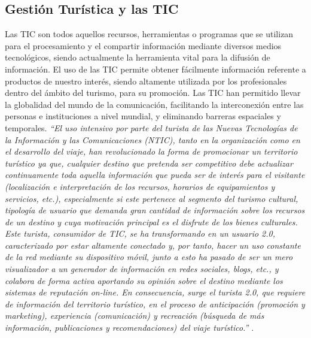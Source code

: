 \documentclass[12pt,letterpaper,openany]{book}
\begin{document}
\subsection{Gestión Turística y las TIC}
Las TIC son todos aquellos recursos, herramientas o programas que se utilizan para el procesamiento y el compartir información mediante diversos medios tecnológicos, siendo actualmente la herramienta vital para la difusión de información.
El uso de las TIC permite obtener fácilmente información referente a productos de nuestro interés, siendo altamente utilizada por los profesionales dentro del ámbito del turismo, para su promoción.
\vspace{5mm}\newline
Las TIC han permitido llevar la globalidad del mundo de la comunicación, facilitando la interconexión entre las personas e instituciones a nivel mundial, y eliminando barreras espaciales y temporales. 
\vspace{5mm}\newline
\textit{``El uso intensivo por parte del turista de las Nuevas Tecnologías de la Información y las Comunicaciones (NTIC), tanto en la organización como en el desarrollo del viaje, han revolucionado la forma de promocionar un territorio turístico ya que, cualquier destino que pretenda ser competitivo debe actualizar continuamente toda aquella información que pueda ser de interés para el visitante (localización e interpretación de los recursos, horarios de equipamientos y servicios, etc.), especialmente si este pertenece al segmento del turismo cultural, tipología de usuario que demanda gran cantidad de información sobre los recursos de un destino y cuya motivación principal es el disfrute de los bienes culturales.
Este turista, consumidor de TIC, se ha transformando en un usuario 2.0, caracterizado por estar altamente conectado y, por tanto, hacer un uso constante de la red mediante su dispositivo móvil, junto a esto ha pasado de ser un mero visualizador a un generador de información en redes sociales, blogs, etc., y colabora de forma activa aportando su opinión sobre el destino mediante los sistemas de reputación on-line. En consecuencia, surge el turista 2.0, que requiere de información del territorio turístico, en el proceso de anticipación (promoción y marketing), experiencia (comunicación) y recreación (búsqueda de más información, publicaciones y recomendaciones) del viaje turístico.''} \cite{9}.
\end{document}
